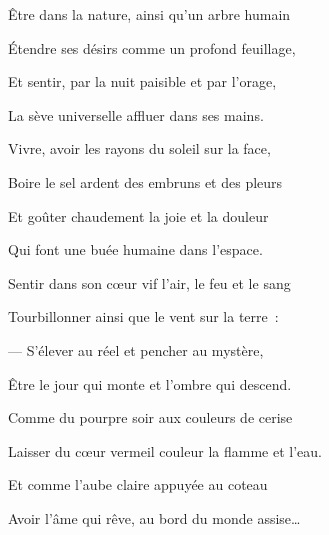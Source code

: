 
{\setlength{\parskip}{0pt}

Être dans la nature, ainsi qu'un arbre humain

Étendre ses désirs comme un profond feuillage,

Et sentir, par la nuit paisible et par l'orage,

La sève universelle affluer dans ses mains.

\medskip

Vivre, avoir les rayons du soleil sur la face,

Boire le sel ardent des embruns et des pleurs

Et goûter chaudement la joie et la douleur

Qui font une buée humaine dans l'espace.

\medskip

Sentir dans son cœur vif l'air, le feu et le sang

Tourbillonner ainsi que le vent sur la terre~:

--- S'élever au réel et pencher au mystère,

Être le jour qui monte et l'ombre qui descend.

\medskip

Comme du pourpre soir aux couleurs de cerise

Laisser du cœur vermeil couleur la flamme et l'eau.

Et comme l'aube claire appuyée au coteau

Avoir l'âme qui rêve, au bord du monde assise…

\setlength{\parskip}{6pt}
}


